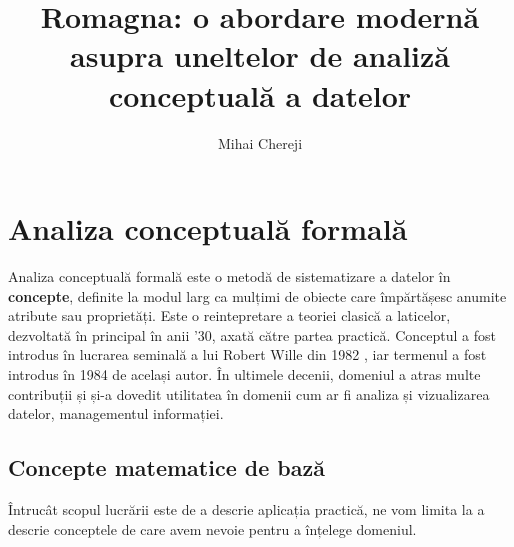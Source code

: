 \documentclass[12pt, a4paper, twoside, romanian]{teza-upb}
\begin{document}
\author{Mihai Chereji}

\title{Romagna: o abordare modernă asupra uneltelor de analiză conceptuală a datelor}




\beforepreface
\listoffigures
\listoftables
{}
\afterpreface 


\chapter{Analiza conceptuală formală}
  Analiza conceptuală formală este o metodă de sistematizare a datelor în \textbf{concepte}, definite la modul larg ca mulțimi de obiecte care împărtășesc anumite atribute sau proprietăți. Este o reintepretare a teoriei clasică a laticelor, dezvoltată în principal în anii '30, axată către partea practică. Conceptul a fost introdus în lucrarea seminală a lui Robert Wille din 1982 \cite{wille:1982}, iar termenul a fost introdus în 1984 de același autor. În ultimele decenii, domeniul a atras multe contribuții și și-a dovedit utilitatea în domenii cum ar fi analiza și vizualizarea datelor, managementul informației.
  \section{Concepte matematice de bază}
    Întrucât scopul lucrării este de a descrie aplicația practică, ne vom limita la a descrie conceptele de care avem nevoie pentru a înțelege domeniul.
\end{document}
